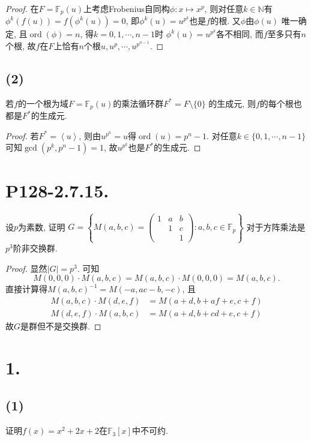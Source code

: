 \documentclass[12pt, a4paper, fontset=windows]{ctexart}
\newcommand{\F}{\mathbb{F}}
\newcommand{\N}{\mathbb{N}}
\newcommand{\abs}[1]{\left|{#1}\right|}
\newcommand{\gen}[1]{\left\langle{#1}\right\rangle}
\newcommand{\ord}{\operatorname{ord}}
\def\pmat#1{\begin{pmatrix}#1\end{pmatrix}}
\begin{document}
\begin{proof}
在$F=\F_p(u)$上考虑Frobenius自同构$\phi:x\mapsto x^p$, 
则对任意$k\in\N$有$\phi^k(f(u))=f(\phi^k(u))=0$, 
即$\phi^k(u)=u^{p^k}$也是$f$的根. 又$\phi$由$\phi(u)$
唯一确定, 且$\ord(\phi)=n$, 得$k=0,1,\cdots,n-1$时
$\phi^k(u)=u^{p^k}$各不相同, 而$f$至多只有$n$个根, 
故$f$在$F$上恰有$n$个根$u,u^p,\cdots,u^{p^{n-1}}$. 
\end{proof}

\subsection*{(2)}

若$f$的一个根为域$F=\F_p(u)$的乘法循环群$F^*=F\setminus\{0\}$
的生成元, 则$f$的每个根也都是$F^*$的生成元. 

\begin{proof}
若$F^*=\gen{u}$, 则由$u^{p^n}=u$得$\ord(u)=p^n-1$. 
对任意$k\in\{0,1,\cdots,n-1\}$可知$\gcd(p^k,p^n-1)=1$, 
故$u^{p^k}$也是$F^*$的生成元. 
\end{proof}

\section*{P128-2.7.15.}

设$p$为素数, 证明
$G=\left\{M(a,b,c)=\pmat{1&a&b\\&1&c\\&&1}:a,b,c\in\F_p\right\}$
对于方阵乘法是$p^3$阶非交换群. 

\begin{proof}
显然$\abs{G}=p^3$. 可知
\[M(0,0,0)\cdot M(a,b,c)=M(a,b,c)\cdot M(0,0,0)=M(a,b,c).\]
直接计算得$M(a,b,c)^{-1}=M(-a,ac-b,-c)$, 且
\begin{align*}
M(a,b,c)\cdot M(d,e,f)&=M(a+d,b+af+e,c+f)\\
M(d,e,f)\cdot M(a,b,c)&=M(a+d,b+cd+e,c+f)
\end{align*}
故$G$是群但不是交换群. 
\end{proof}

\section*{1.}

\subsection*{(1)}

证明$f(x)=x^2+2x+2$在$\F_3[x]$中不可约. 
\end{document}
